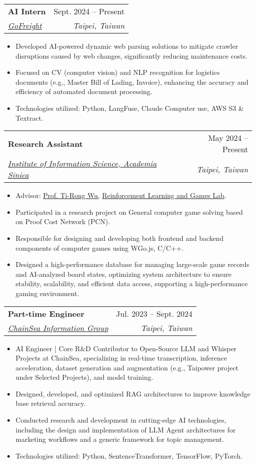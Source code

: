 \documentclass[letterpaper,10pt]{article}
\makeatletter
\newcommand{\resumeItem}[1]{
  \item\small{
    {#1 \vspace{-2pt}}
  }
}
\newcommand{\resumeSubheading}[4]{
  \vspace{-2pt}\item
    \begin{tabular*}{0.97\textwidth}[t]{l@{\extracolsep{\fill}}r}
      \textbf{#1} & #2 \\
      \textit{\small#3} & \textit{\small #4} \\
    \end{tabular*}\vspace{-7pt}
}
\newcommand{\resumeItemListStart}{\begin{itemize}}
\newcommand{\resumeItemListEnd}{\end{itemize}\vspace{-5pt}}
\makeatother
\begin{document}
    \resumeSubheading
      {AI Intern}{Sept. 2024 -- Present}
      {\href{https://www.gofreight.com/}{GoFreight}}{Taipei, Taiwan}
      \resumeItemListStart
        \resumeItem{Developed AI-powered dynamic web parsing solutions to mitigate crawler disruptions caused by web changes, significantly reducing maintenance costs.}
        \resumeItem{Focused on CV (computer vision) and NLP recognition for logistics documents (e.g., Master Bill of Lading, Invoice), enhancing the accuracy and efficiency of automated document processing.}
        \resumeItem{Technologies utilized: Python, LangFuse, Claude Computer use, AWS S3 \& Textract.}
      \resumeItemListEnd

    \resumeSubheading
      {Research Assistant}{May 2024 -- Present}
      {\href{https://www.iis.sinica.edu.tw/en/page/AboutUs/Introduction.html}{Institute of Information Science, Academia Sinica}}{Taipei, Taiwan}
      \resumeItemListStart
        \resumeItem{Advisor: \href{https://homepage.iis.sinica.edu.tw/pages/tirongwu/index_en.html}{Prof. Ti-Rong Wu}, \href{https://github.com/rlglab/}{Reinforcement Learning and Games Lab}.}
         \resumeItem{Participated in a research project on General computer game solving based on Proof Cost Network (PCN).}
        \resumeItem{Responsible for designing and developing both frontend and backend components of computer games using WGo.js, C/C++.}
        \resumeItem{Designed a high-performance database for managing large-scale game records and AI-analyzed board states, optimizing system architecture to ensure stability, scalability, and efficient data access, supporting a high-performance gaming environment.}
      \resumeItemListEnd

    \resumeSubheading
      {Part-time Engineer}{Jul. 2023 -- Sept. 2024}
      {\href{https://www.chainsea.com.tw/about/introduction/}{ChainSea Information Group}}{Taipei, Taiwan}
      \resumeItemListStart
        \resumeItem{AI Engineer | Core R\&D Contributor to Open-Source LLM and Whisper Projects at ChainSea, specializing in real-time transcription, inference acceleration, dataset generation and augmentation (e.g., Taipower project under Selected Projects), and model training.}
        \resumeItem{Designed, developed, and optimized RAG architectures to improve knowledge base retrieval accuracy.}
        \resumeItem{Conducted research and development in cutting-edge AI technologies, including the design and implementation of LLM Agent architectures for marketing workflows and a generic framework for topic management.}
        \resumeItem{Technologies utilized: Python, SentenceTransformer, TensorFlow, PyTorch.}
      \resumeItemListEnd
\end{document}
